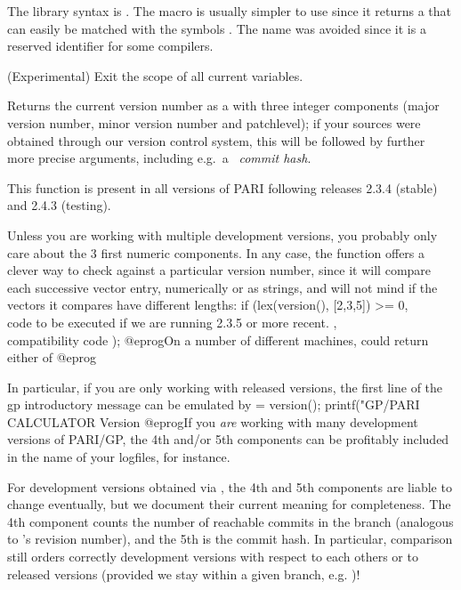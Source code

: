 {The library syntax is .
The macro  is usually simpler to use since it returns a
 that can easily be matched with the symbols \typ{*}. The name
 was avoided since it is a reserved identifier for some compilers.

\label{se:uninline}
(Experimental) Exit the scope of all current  variables.

\label{se:version}
Returns the current version number as a  with three integer
components (major version number, minor version number and patchlevel);
if your sources were obtained through our version control system, this will
be followed by further more precise arguments, including
e.g.~a~ \emph{commit hash}.

This function is present in all versions of PARI following releases 2.3.4
(stable) and 2.4.3 (testing).

Unless you are working with multiple development versions, you probably only
care about the 3 first numeric components. In any case, the  function
offers a clever way to check against a particular version number, since it will
compare each successive vector entry, numerically or as strings, and will not
mind if the vectors it compares have different lengths:
\bprog
   if (lex(version(), [2,3,5]) >= 0,
     \\ code to be executed if we are running 2.3.5 or more recent.
   ,
     \\ compatibility code
   );
@eprog\noindent On a number of different machines,  could return either of
\bprog
@eprog

In particular, if you are only working with released versions, the first
line of the gp introductory message can be emulated by
\bprog
   [M,m,p] = version();
   printf("GP/PARI CALCULATOR Version %
 @eprog\noindent If you \emph{are} working with many development versions of
 PARI/GP, the 4th and/or 5th components can be profitably included in the
 name of your logfiles, for instance.

  For development versions obtained via ,
 the 4th and 5th components are liable to change eventually, but we document
 their current meaning for completeness. The 4th component counts the number
 of reachable commits in the branch (analogous to 's revision
 number), and the 5th is the  commit hash. In particular, 
 comparison still orders correctly development versions with respect to each
 others or to released versions (provided we stay within a given branch,
 e.g. )!

}
